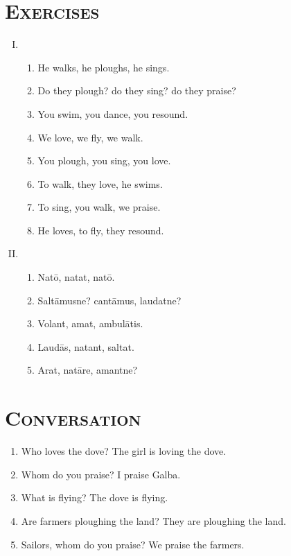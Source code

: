 \documentclass[12pt]{article}
\begin{document}
\section{\textsc{Exercises}}
\begin{enumerate}[I.]
	\setlength{\itemsep}{1em}
	\item \begin{enumerate}[1)]
		\item He walks, he ploughs, he sings.
		\item Do they plough? do they sing? do they praise?
		\item You swim, you dance, you resound.
		\item We love, we fly, we walk.
		\item You plough, you sing, you love.
		\item To walk, they love, he swims.
		\item To sing, you walk, we praise.
		\item He loves, to fly, they resound.
	\end{enumerate}
	\item \begin{enumerate}[1)]
		\item Natō, natat, natō.
		\item Saltāmusne? cantāmus, laudatne?
		\item Volant, amat, ambulātis.
		\item Laudās, natant, saltat.
		\item Arat, natāre, amantne?
	\end{enumerate}
\end{enumerate}

\section{\textsc{Conversation}}
\begin{enumerate}[1.]
	\item Who loves the dove? The girl is loving the dove.
	\item Whom do you praise? I praise Galba.
	\item What is flying? The dove is flying.
	\item Are farmers ploughing the land? They are ploughing the land.
	\item Sailors, whom do you praise? We praise the farmers.
\end{enumerate}
\end{document}
